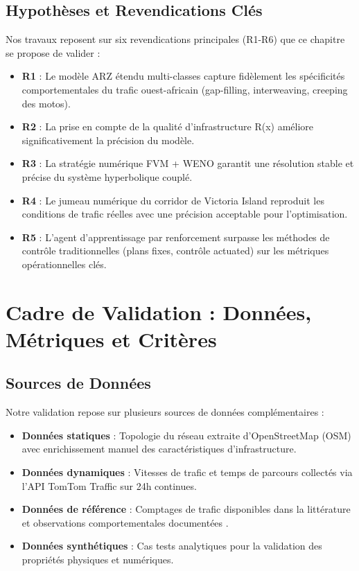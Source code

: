 \subsection{Hypothèses et Revendications Clés}
\label{subsec:hypotheses_revendications}

Nos travaux reposent sur six revendications principales (R1-R6) que ce chapitre se propose de valider :

\begin{itemize}
  \item \textbf{R1} : Le modèle ARZ étendu multi-classes capture fidèlement les spécificités comportementales du trafic ouest-africain (gap-filling, interweaving, creeping des motos).
  \item \textbf{R2} : La prise en compte de la qualité d'infrastructure R(x) améliore significativement la précision du modèle.
  \item \textbf{R3} : La stratégie numérique FVM + WENO garantit une résolution stable et précise du système hyperbolique couplé.
  \item \textbf{R4} : Le jumeau numérique du corridor de Victoria Island reproduit les conditions de trafic réelles avec une précision acceptable pour l'optimisation.
  \item \textbf{R5} : L'agent d'apprentissage par renforcement surpasse les méthodes de contrôle traditionnelles (plans fixes, contrôle actuated) sur les métriques opérationnelles clés.

\end{itemize}


\section{Cadre de Validation : Données, Métriques et Critères}
\label{sec:cadre_validation}

\subsection{Sources de Données}
\label{subsec:sources_donnees}

Notre validation repose sur plusieurs sources de données complémentaires :

\begin{itemize}
  \item \textbf{Données statiques} : Topologie du réseau extraite d'OpenStreetMap (OSM) avec enrichissement manuel des caractéristiques d'infrastructure.
  \item \textbf{Données dynamiques} : Vitesses de trafic et temps de parcours collectés via l'API TomTom Traffic sur 24h continues.
  \item \textbf{Données de référence} : Comptages de trafic disponibles dans la littérature \cite{ludi2020traffic} et observations comportementales documentées \cite{gomina2013urban}.
  \item \textbf{Données synthétiques} : Cas tests analytiques pour la validation des propriétés physiques et numériques.
\end{itemize}


